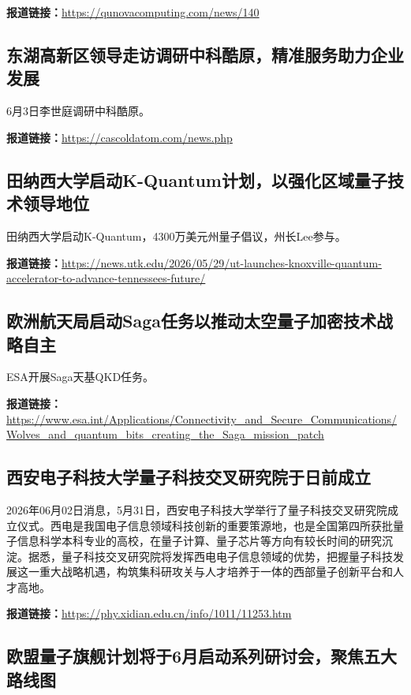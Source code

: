 \documentclass[12pt,a4paper]{ctexart}
\begin{document}
\noindent\textbf{报道链接：}\url{https://qunovacomputing.com/news/140}

\subsection{ 东湖高新区领导走访调研中科酷原，精准服务助力企业发展 }

6月3日李世庭调研中科酷原。

\noindent\textbf{报道链接：}\url{https://cascoldatom.com/news.php}

\subsection{ 田纳西大学启动K-Quantum计划，以强化区域量子技术领导地位 }

田纳西大学启动K-Quantum，4300万美元州量子倡议，州长Lee参与。

\noindent\textbf{报道链接：}\url{https://news.utk.edu/2026/05/29/ut-launches-knoxville-quantum-accelerator-to-advance-tennessees-future/}

\subsection{ 欧洲航天局启动Saga任务以推动太空量子加密技术战略自主 }

ESA开展Saga天基QKD任务。

\noindent\textbf{报道链接：}\url{https://www.esa.int/Applications/Connectivity\_and\_Secure\_Communications/Wolves\_and\_quantum\_bits\_creating\_the\_Saga\_mission\_patch}

\subsection{ 西安电子科技大学量子科技交叉研究院于日前成立 }

2026年06月02日消息，5月31日，西安电子科技大学举行了量子科技交叉研究院成立仪式。西电是我国电子信息领域科技创新的重要策源地，也是全国第四所获批量子信息科学本科专业的高校，在量子计算、量子芯片等方向有较长时间的研究沉淀。据悉，量子科技交叉研究院将发挥西电电子信息领域的优势，把握量子科技发展这一重大战略机遇，构筑集科研攻关与人才培养于一体的西部量子创新平台和人才高地。

\noindent\textbf{报道链接：}\url{https://phy.xidian.edu.cn/info/1011/11253.htm}

\subsection{ 欧盟量子旗舰计划将于6月启动系列研讨会，聚焦五大路线图 }
\end{document}
